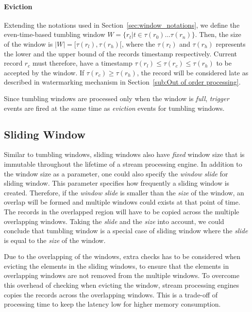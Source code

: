 \paragraph{Eviction}%
Extending the notations used in Section~\ref{sec:window_notations}, we define 
the even-time-based tumbling window $W = \{r_t |  t \in \tau(r_0) \dots \tau(r_n) \}$. 
Then, the size of the window is $|W| = [\tau(r_l), \tau(r_h)[$, where the 
$\tau(r_l)$ and $\tau(r_h)$ represents the lower and the upper bound of the 
records timestamp respectively. 
Current record $r_c$ must therefore, have a timestamp  $\tau(r_l) \le \tau(r_c) \le \tau(r_h)$ 
to be accepted by the window. If $\tau(r_c) \ge \tau(r_h)$, the record will be 
considered late as described in watermarking mechanism in Section~\ref{sub:Out of order processing}. 


Since tumbling windows are processed only when the window is \emph{full}, \emph{trigger} events 
are fired at the same time as \emph{eviction} events for tumbling windows.


\subsection{Sliding Window}%
\label{sec:Sliding Window}
Similar to tumbling windows, sliding windows also have \emph{fixed} window size 
that is immutable throughout the lifetime of a stream processing engine. 
In addition to the window size as a parameter, one could also specify the 
\emph{window slide} for sliding window. This parameter specifies how frequently 
a sliding window is created. 
Therefore, if the \emph{window slide} is smaller 
than the \emph{size} of the window, an overlap will be formed and multiple 
windows could exists at that point of time. The records in the overlapped region 
will have to be copied across the multiple overlapping windows. 
Taking the \emph{slide} and the \emph{size} into account, we could conclude that 
tumbling window is a special case of sliding window where the \emph{slide} is 
equal to the \emph{size} of the window.

Due to the overlapping of the windows, extra checks has to be considered 
when evicting the elements in the sliding windows, to ensure that the elements in 
overlapping windows are not removed from the multiple windows. To overcome this overhead 
of checking when evicting the window, 
stream processing engines copies the records across the overlapping windows. 
This is a trade-off of processing time to keep the latency low for higher memory consumption. 

